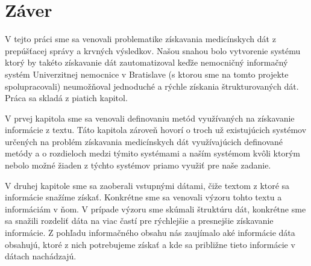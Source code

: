 \chapter*{Záver}  %





V tejto práci sme sa venovali problematike získavania medicínskych dát z prepúšťacej správy a krvných výsledkov. Našou snahou bolo vytvorenie systému ktorý by takéto získavanie dát zautomatizoval keďže nemocničný informačný systém Univerzitnej nemocnice v Bratislave (s ktorou sme na tomto projekte spolupracovali) neumožňoval jednoduché a rýchle získania štrukturovaných dát. Práca sa skladá z piatich kapitol. 

V prvej kapitola sme sa venovali definovaniu metód využívaných na získavanie informácie z textu. Táto kapitola zároveň hovorí o troch už existujúcich systémov určených na problém získavania medicínskych dát využívajúcich definované metódy a o rozdieloch medzi týmito systémami a naším systémom kvôli ktorým nebolo možné žiaden z týchto systémov priamo využiť pre naše zadanie.

V druhej kapitole sme sa zaoberali vstupnými dátami, čiže textom z ktoré sa informácie snažíme získať. Konkrétne sme sa venovali výzoru tohto textu a informáciám v ňom. V prípade výzoru sme skúmali štruktúru dát, konkrétne sme sa snažili rozdeliť dáta na viac častí pre rýchlejšie a presnejšie získavanie informácie. Z pohľadu informačného obsahu nás zaujímalo aké informácie dáta obsahujú, ktoré z nich potrebujeme získať a kde sa približne tieto informácie v dátach nachádzajú.   

